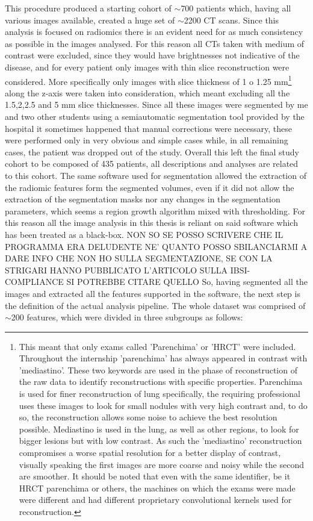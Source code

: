 This procedure produced a starting cohort of $\sim$700 patients which, having all various images available, created a huge set of $\sim$2200 CT scans. Since this analysis is focused on radiomics there is an evident need for as much consistency as possible in the images analysed. For this reason all CTs taken with medium of contrast were excluded, since they would have brightnesses not indicative of the disease, and for every patient only images with thin slice reconstruction were considered. More specifically only images with slice thickness of 1 o 1.25 mm\footnote{This meant that only exams called 'Parenchima' or  'HRCT' were included. Throughout the internship 'parenchima' has always appeared in contrast with 'mediastino'. These two keywords are used in the phase of reconstruction of the raw data to identify reconstructions with specific properties. Parenchima is used for finer reconstruction of lung specifically, the requiring professional uses these images to look for small nodules with very high contrast and, to do so, the reconstruction allows some noise to achieve the best resolution possible. Mediastino is used in the lung, as well as other regions, to look for bigger lesions but with low contrast. As such the 'mediastino' reconstruction compromises a worse spatial resolution for a better display of contrast, visually speaking the first images are more coarse and noisy while the second are smoother. It should be noted that even with the same identifier, be it HRCT parenchima or others, the machines on which the exams were made were different and had different proprietary convolutional kernels used for reconstruction.} along the z-axis were taken into consideration, which meant excluding all the 1.5,2,2.5 and 5 mm slice thicknesses.
Since all these images were segmented by me and two other students using a semiautomatic segmentation tool provided by the hospital it sometimes happened that manual corrections were necessary, these were performed only in very obvious and simple cases while, in all remaining cases, the patient was dropped out of the study. 
Overall this left the final study cohort to be composed of 435 patients, all descriptions and analyses are related to this cohort.
The same software used for segmentation allowed the extraction of the radiomic features form the segmented volumes, even if it did not allow the extraction of the segmentation masks nor any changes in the segmentation parameters, which seems a region growth algorithm mixed with thresholding. For this reason all the image analysis in this thesis is reliant on said software which has been treated as a black-box.
\large{NON SO SE POSSO SCRIVERE CHE IL PROGRAMMA ERA DELUDENTE NE' QUANTO POSSO SBILANCIARMI A DARE INFO CHE NON HO SULLA SEGMENTAZIONE, SE CON LA STRIGARI HANNO PUBBLICATO L'ARTICOLO SULLA IBSI-COMPLIANCE SI POTREBBE CITARE QUELLO}
So, having segmented all the images and extracted all the features supported in the software, the next step is the definition of the actual analysis pipeline. The whole dataset was comprised of $\sim$200 features, which were divided in three subgroups as follows:


